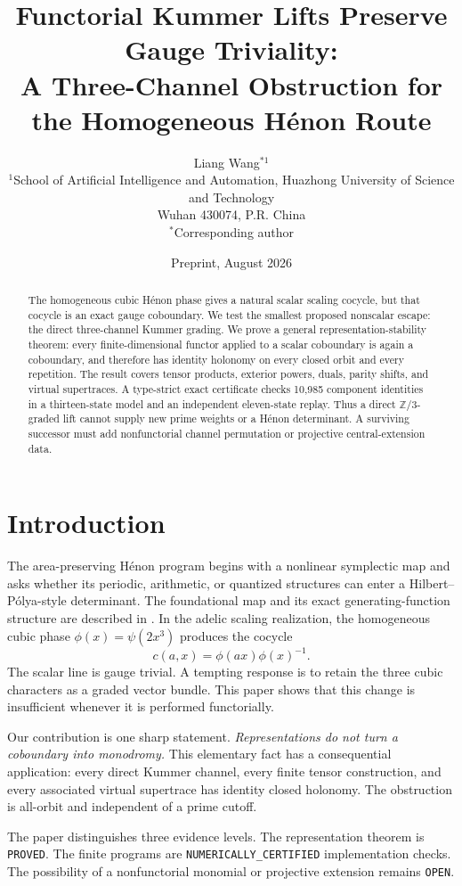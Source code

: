 \documentclass[11pt]{article}
\title{Functorial Kummer Lifts Preserve Gauge Triviality:\\
A Three-Channel Obstruction for the Homogeneous H\'enon Route}
\author{Liang Wang$^{*1}$\\
\small $^{1}$School of Artificial Intelligence and Automation, Huazhong University of Science and Technology\\
\small Wuhan 430074, P.R. China\\
\small $^*$Corresponding author}
\date{Preprint, August 2026}
\theoremstyle{definition}\newtheorem{definition}[theorem]{Definition}
\theoremstyle{remark}\newtheorem{remark}[theorem]{Remark}
\begin{document}
\maketitle

\begin{abstract}
The homogeneous cubic H\'enon phase gives a natural scalar scaling cocycle,
but that cocycle is an exact gauge coboundary.  We test the smallest proposed
nonscalar escape: the direct three-channel Kummer grading.  We prove a general
representation-stability theorem: every finite-dimensional functor applied
to a scalar coboundary is again a coboundary, and therefore has identity
holonomy on every closed orbit and every repetition.  The result covers
tensor products, exterior powers, duals, parity shifts, and virtual
supertraces.  A type-strict exact certificate checks 10,985 component
identities in a thirteen-state model and an independent eleven-state replay.
Thus a direct \(\mathbb Z/3\)-graded lift cannot supply new prime weights or a
H\'enon determinant.  A surviving successor must add nonfunctorial channel
permutation or projective central-extension data.
\end{abstract}

\section{Introduction}
The area-preserving H\'enon program begins with a nonlinear symplectic map and
asks whether its periodic, arithmetic, or quantized structures can enter a
Hilbert--P\'olya-style determinant.  The foundational map and its exact
generating-function structure are described in \cite{Wang2026}.  In the
adelic scaling realization, the homogeneous cubic phase
\(\phi(x)=\psi(2x^3)\) produces the cocycle
\[
 c(a,x)=\phi(ax)\phi(x)^{-1}.
\]
The scalar line is gauge trivial.  A tempting response is to retain the three
cubic characters as a graded vector bundle.  This paper shows that this
change is insufficient whenever it is performed functorially.

Our contribution is one sharp statement.  \emph{Representations do not turn
a coboundary into monodromy.}  This elementary fact has a consequential
application: every direct Kummer channel, every finite tensor construction,
and every associated virtual supertrace has identity closed holonomy.  The
obstruction is all-orbit and independent of a prime cutoff.

The paper distinguishes three evidence levels.  The representation theorem
is \texttt{PROVED}.  The finite programs are
\texttt{NUMERICALLY\_CERTIFIED} implementation checks.  The possibility of a
nonfunctorial monomial or projective extension remains \texttt{OPEN}.
\end{document}
